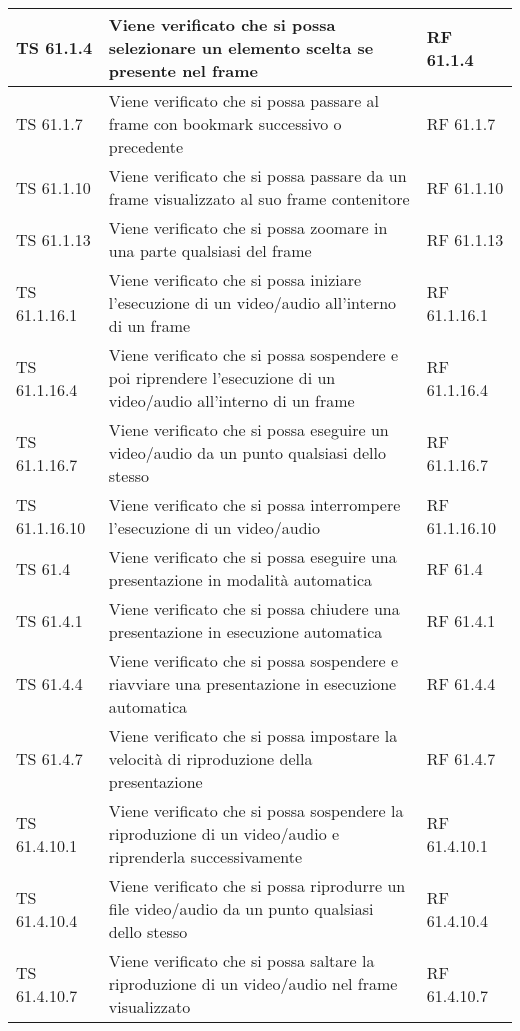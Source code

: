 {{\begin{longtable} [c]{| p{3cm} | p{6cm} |p{3cm}|}
			\hline
			TS 61.1.4 & Viene verificato che si possa selezionare un elemento scelta\ped{g} se presente nel frame\ped{g} & RF 61.1.4\\
			\hline
			TS 61.1.7 & Viene verificato che si possa passare al frame\ped{g} con bookmark\ped{g} successivo o precedente & RF 61.1.7\\
			\hline
			TS 61.1.10 & Viene verificato che si possa passare da un frame\ped{g} visualizzato al suo frame\ped{g} contenitore & RF 61.1.10\\
			\hline
			TS 61.1.13 & Viene verificato che si possa zoomare in una parte qualsiasi del frame\ped{g} & RF 61.1.13\\
			\hline
			TS 61.1.16.1 & Viene verificato che si possa iniziare l’esecuzione di un video/audio all'interno di un frame\ped{g} & RF 61.1.16.1\\
			\hline
			TS 61.1.16.4 & Viene verificato che si possa sospendere\ped{g} e poi riprendere l'esecuzione di un video/audio all'interno di un frame\ped{g} & RF 61.1.16.4\\
			\hline
			TS 61.1.16.7 & Viene verificato che si possa eseguire un video/audio da un punto qualsiasi dello stesso & RF 61.1.16.7\\
			\hline
			TS 61.1.16.10 & Viene verificato che si possa interrompere l'esecuzione di un video/audio & RF 61.1.16.10\\
			\hline
			TS 61.4 & Viene verificato che si possa eseguire una presentazione in modalità automatica & RF 61.4\\
			\hline
			TS 61.4.1 & Viene verificato che si possa chiudere una presentazione in esecuzione automatica & RF 61.4.1\\
			\hline
			TS 61.4.4 & Viene verificato che si possa sospendere\ped{g} e riavviare una presentazione in esecuzione automatica & RF 61.4.4\\
			\hline
			TS 61.4.7 & Viene verificato che si possa impostare la velocità di riproduzione della presentazione & RF 61.4.7\\
			\hline
			TS 61.4.10.1 & Viene verificato che si possa sospendere la riproduzione di un video/audio e riprenderla successivamente & RF 61.4.10.1\\
			\hline
			TS 61.4.10.4 & Viene verificato che si possa riprodurre un file video/audio da un punto qualsiasi dello stesso & RF 61.4.10.4\\
			\hline
			TS 61.4.10.7 & Viene verificato che si possa saltare la riproduzione di un video/audio nel frame\ped{g} visualizzato & RF 61.4.10.7\\

\end{longtable}}}
